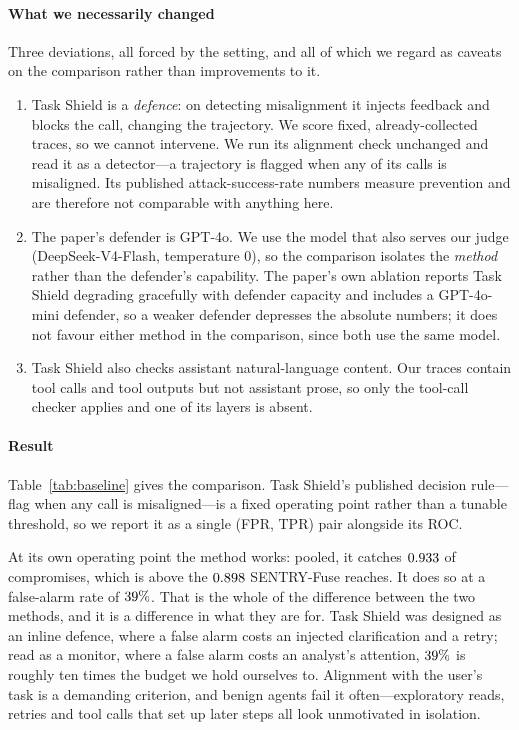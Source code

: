 \documentclass[preprint,12pt,authoryear]{elsarticle}
\theoremstyle{definition}
\begin{document}
\paragraph{What we necessarily changed} Three deviations, all forced by the
setting, and all of which we regard as caveats on the comparison rather than
improvements to it.
\begin{enumerate}
\item Task Shield is a \emph{defence}: on detecting misalignment it injects
feedback and blocks the call, changing the trajectory. We score fixed,
already-collected traces, so we cannot intervene. We run its alignment check
unchanged and read it as a detector---a trajectory is flagged when any of its
calls is misaligned. Its published attack-success-rate numbers measure prevention
and are therefore not comparable with anything here.
\item The paper's defender is GPT-4o. We use the model that also serves our judge
(DeepSeek-V4-Flash, temperature $0$), so the comparison isolates the \emph{method}
rather than the defender's capability. The paper's own ablation reports Task Shield
degrading gracefully with defender capacity and includes a GPT-4o-mini defender, so
a weaker defender depresses the absolute numbers; it does not favour either method
in the comparison, since both use the same model.
\item Task Shield also checks assistant natural-language content. Our traces
contain tool calls and tool outputs but not assistant prose, so only the tool-call
checker applies and one of its layers is absent.
\end{enumerate}

\paragraph{Result} Table~\ref{tab:baseline} gives the comparison. Task Shield's
published decision rule---flag when any call is misaligned---is a fixed operating
point rather than a tunable threshold, so we report it as a single (FPR, TPR) pair
alongside its ROC.

At its own operating point the method works: pooled, it catches $0.933$ of
compromises, which is above the $0.898$ SENTRY-Fuse reaches. It does so at a
false-alarm rate of $39\%$. That is the whole of the difference
between the two methods, and it is a difference in what they are for. Task Shield
was designed as an inline defence, where a false alarm costs an injected
clarification and a retry; read as a monitor, where a false alarm costs an analyst's
attention, $39\%$ is roughly ten times the budget we hold ourselves
to. Alignment with the user's task is a demanding criterion, and benign agents fail
it often---exploratory reads, retries and tool calls that set up later steps all
look unmotivated in isolation.
\end{document}

